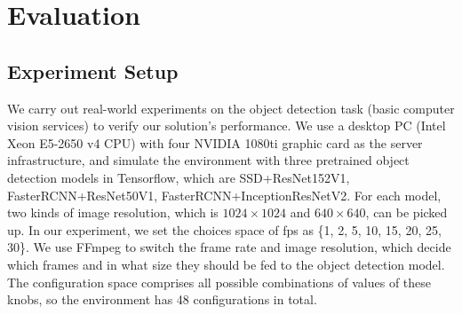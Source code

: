 \section{Evaluation}
\label{Section: experiment}

\subsection{Experiment Setup}
\label{subsec: configuration}
We carry out real-world experiments on the object detection task (basic computer vision services) to verify our solution’s performance. We use a desktop PC (Intel Xeon E5-2650 v4 CPU) with four NVIDIA 1080ti graphic card as the server infrastructure, and simulate the environment \cite{trade-offs} with three pretrained object detection models in Tensorflow, which are SSD+ResNet152V1, FasterRCNN+ResNet50V1, FasterRCNN+InceptionResNetV2. For each model, two kinds of image resolution, which is $1024\times1024$ and $640\times640$, can be picked up. In our experiment, we set the choices space of fps as \{1, 2, 5, 10, 15, 20, 25, 30\}. We use FFmpeg to switch the frame rate and image resolution, which decide which frames and in what size they should be fed to the object detection model. The configuration space comprises all possible combinations of values of these knobs, so the environment has 48 configurations in total.

